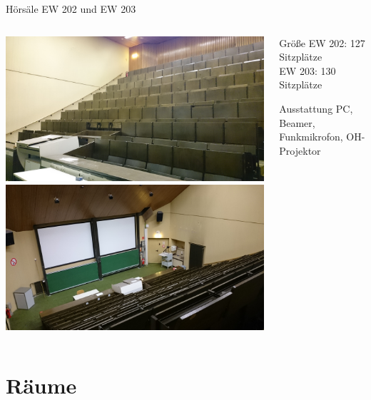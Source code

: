 \documentclass[compress,]{beamer}
\begin{document}
\begin{frame}{Hörsäle EW 202 und EW 203}
\begin{columns}[onlytextwidth]
\begin{column}{0.5\textwidth}
\includegraphics[scale=0.04]{images/DSC_0714.JPG}\\
\includegraphics[scale=0.04]{images/DSC_0713.JPG}
\end{column}
\begin{column}{0.4\textwidth}
\begin{block}{Größe}
EW 202: 127 Sitzplätze\\
EW 203: 130 Sitzplätze
\end{block}
\vspace{1cm}
\begin{block}{Ausstattung}
PC, Beamer, Funkmikrofon, OH-Projektor
\end{block}
\end{column}
\end{columns}
\end{frame}


\section{Räume}
\end{document}
